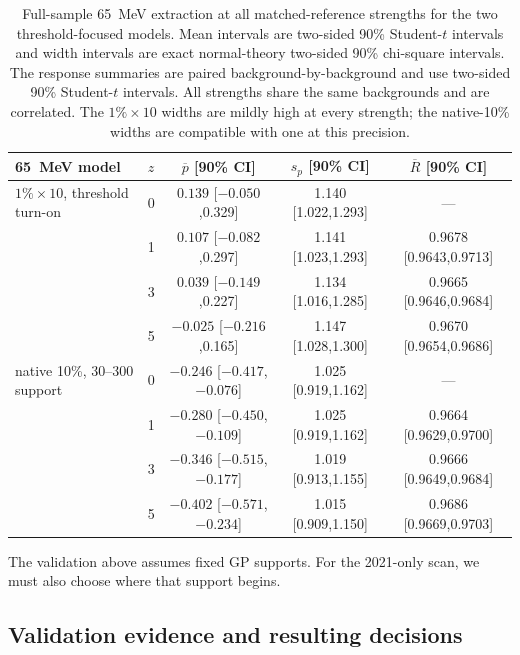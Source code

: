 \begin{table}[htbp]
\centering
\small
\begin{tabular}{llccc}
\toprule
65~MeV model & $z$ & $\overline p$ [90\% CI] & $s_p$ [90\% CI] & $\overline R$ [90\% CI] \\
\midrule
$1\%\times10$, threshold turn-on & 0 & $0.139$ [$-0.050$,0.329] & 1.140 [1.022,1.293] & --- \\
 & 1 & $0.107$ [$-0.082$,0.297] & 1.141 [1.023,1.293] & 0.9678 [0.9643,0.9713] \\
 & 3 & $0.039$ [$-0.149$,0.227] & 1.134 [1.016,1.285] & 0.9665 [0.9646,0.9684] \\
 & 5 & $-0.025$ [$-0.216$,0.165] & 1.147 [1.028,1.300] & 0.9670 [0.9654,0.9686] \\
\addlinespace
native 10\%, 30--300 support & 0 & $-0.246$ [$-0.417$,$-0.076$] & 1.025 [0.919,1.162] & --- \\
 & 1 & $-0.280$ [$-0.450$,$-0.109$] & 1.025 [0.919,1.162] & 0.9664 [0.9629,0.9700] \\
 & 3 & $-0.346$ [$-0.515$,$-0.177$] & 1.019 [0.913,1.155] & 0.9666 [0.9649,0.9684] \\
 & 5 & $-0.402$ [$-0.571$,$-0.234$] & 1.015 [0.909,1.150] & 0.9686 [0.9669,0.9703] \\
\bottomrule
\end{tabular}
\caption{Full-sample 65~MeV extraction at all matched-reference strengths for the two
threshold-focused models. Mean intervals are two-sided 90\% Student-$t$ intervals and
width intervals are exact normal-theory two-sided 90\% chi-square intervals.  The
response summaries are paired background-by-background and use two-sided 90\%
Student-$t$ intervals.  All strengths share the same backgrounds and are correlated.  The
$1\%\times10$ widths are mildly high at every strength; the native-10\% widths are
compatible with one at this precision.}
\label{tab:v491-injection-recovery}
\end{table}

\ifwritingsample
The validation above assumes fixed GP supports. For the 2021-only scan, we must also
choose where that support begins.


\fi

\subsection{Validation evidence and resulting decisions}
\label{sec:v501-validation-decisions}

